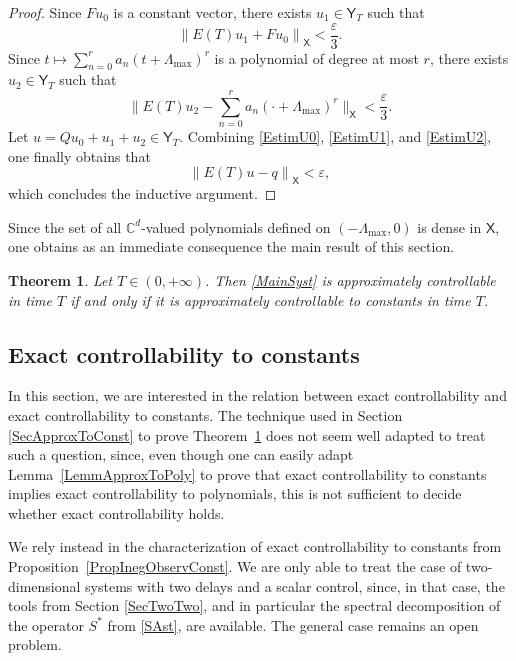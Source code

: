 \documentclass[10pt]{amsart}
\theoremstyle{plain}
\newtheorem{theo}{Theorem}[section]
\theoremstyle{definition}
\newcommand{\norm}[1]{\left\lVert #1\right\lVert}
\newcommand{\bgnorm}[1]{\biggl\lVert #1\biggr\lVert}
\begin{document}
\begin{proof}
Since $F u_0$ is a constant vector, there exists $u_1 \in \mathsf Y_T$ such that
\begin{equation}
\label{EstimU1}
\norm{E(T) u_1 + F u_0}_{\mathsf X} < \frac{\varepsilon}{3}.
\end{equation}
Since $t \mapsto \sum_{n=0}^r a_n (t + \Lambda_{\max})^r$ is a polynomial of degree at most $r$, there exists $u_2 \in \mathsf Y_T$ such that
\begin{equation}
\label{EstimU2}
\bgnorm{E(T) u_2 - \sum_{n=0}^r a_n (\cdot + \Lambda_{\max})^r}_{\mathsf X} < \frac{\varepsilon}{3}.
\end{equation}
Let $u = Q u_0 + u_1 + u_2 \in \mathsf Y_T$. Combining \eqref{EstimU0}, \eqref{EstimU1}, and \eqref{EstimU2}, one finally obtains that
\[
\norm{E(T) u - q}_{\mathsf X} < \varepsilon,
\]
which concludes the inductive argument.
\end{proof}

Since the set of all $\mathbb C^d$-valued polynomials defined on $(-\Lambda_{\max}, 0)$ is dense in $\mathsf X$, one obtains as an immediate consequence the main result of this section.


\begin{theo}
\label{TheoApproxConstant}
Let $T \in (0, +\infty)$. Then \eqref{MainSyst} is approximately controllable in time $T$ if and only if it is approximately controllable to constants in time $T$.
\end{theo}


\subsection{Exact controllability to constants}

In this section, we are interested in the relation between exact controllability and exact controllability to constants. The technique used in Section \ref{SecApproxToConst} to prove Theorem~\ref{TheoApproxConstant} does not seem well adapted to treat such a question, since, even though one can easily adapt Lemma~\ref{LemmApproxToPoly} to prove that exact controllability to constants implies exact controllability to polynomials, this is not sufficient to decide whether exact controllability holds.

We rely instead in the characterization of exact controllability to constants from Proposition~\ref{PropInegObservConst}. We are only able to treat the case of two-dimensional systems with two delays and a scalar control, since, in that case, the tools from Section \ref{SecTwoTwo}, and in particular the spectral decomposition of the operator $S^\ast$ from \eqref{SAst}, are available. The general case remains an open problem.
\end{document}
